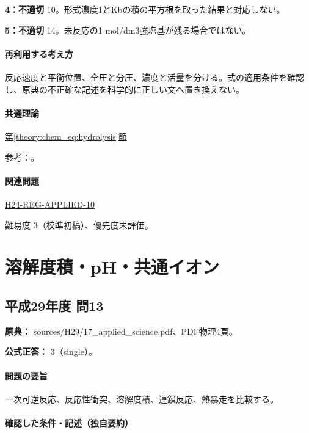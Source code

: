 \noindent\textbf{4：不適切} 10。形式濃度1とKbの積の平方根を取った結果と対応しない。\par

\noindent\textbf{5：不適切} 14。未反応の1 mol/dm3強塩基が残る場合ではない。\par

\paragraph{再利用する考え方} 反応速度と平衡位置、全圧と分圧、濃度と活量を分ける。式の適用条件を確認し、原典の不正確な記述を科学的に正しい文へ置き換えない。

\paragraph{共通理論} \hyperref[theory:chem_eq:hydrolysis]{第\ref*{theory:chem_eq:hydrolysis}節}

\par 参考：\cite{iupac_greenbook2012,mit_buffer2008}。

\paragraph{関連問題} \hyperref[q:h24-reg-applied-10]{H24-REG-APPLIED-10}

\par 難易度 3（校準初稿）、優先度未評価。

\section{溶解度積・pH・共通イオン}

\subsection{平成29年度 問13}
\label{q:h29-reg-applied-13}

\noindent\textbf{原典：} sources/H29/17\_applied\_science.pdf、PDF物理4頁。

\textbf{公式正答：} 3（single）。

\paragraph{問題の要旨} 一次可逆反応、反応性衝突、溶解度積、連鎖反応、熱暴走を比較する。

\paragraph{確認した条件・記述（独自要約）}\mbox{}\par

